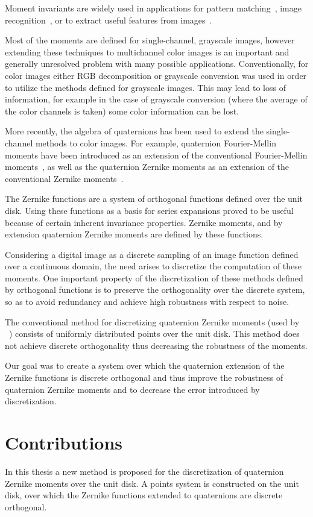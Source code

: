 Moment invariants are widely used in applications for pattern matching~\cite{app2}, image recognition~\cite{pattern_recognition}, or to extract useful features from images~\cite{zernike_nn}.

Most of the moments are defined for single-channel, grayscale images, however extending these techniques to multichannel color images is an important and generally unresolved problem with many possible applications. Conventionally, for color images either RGB decomposition or grayscale conversion was used in order to utilize the methods defined for grayscale images. This may lead to loss of information, for example in the case of grayscale conversion (where the average of the color channels is taken) some color information can be lost.

More recently, the algebra of quaternions has been used to extend the single-channel methods to color images. For example, quaternion Fourier-Mellin moments have been introduced as an extension of the conventional Fourier-Mellin moments~\cite{qfmm}, as well as the quaternion Zernike moments as an extension of the conventional Zernike moments~\cite{qzm}.

The Zernike functions are a system of orthogonal functions defined over the unit disk. Using these functions as a basis for series expansions proved to be useful because of certain inherent invariance properties. Zernike moments, and by extension quaternion Zernike moments are defined by these functions.

Considering a digital image as a discrete sampling of an image function defined over a continuous domain, the need arises to discretize the computation of these moments. One important property of the discretization of these methods defined by orthogonal functions is to preserve the orthogonality over the discrete system, so as to avoid redundancy and achieve high robustness with respect to noise.

The conventional method for discretizing quaternion Zernike moments (used by \citeauthor{qzmi}~\cite{qzmi}) consists of uniformly distributed points over the unit disk. This method does not achieve discrete orthogonality thus decreasing the robustness of the moments. 

Our goal was to create a system over which the quaternion extension of the Zernike functions is discrete orthogonal and thus improve the robustness of quaternion Zernike moments and to decrease the error introduced by discretization.


\section{Contributions}
In this thesis a new method is proposed for the discretization of quaternion Zernike moments over the unit disk. A points system is constructed on the unit disk, over which the Zernike functions extended to quaternions are discrete orthogonal. 

